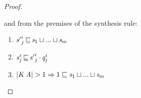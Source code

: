 \begin{proof}
\begin{enumerate}
        and from the premises of the synthesis rule:
        \begin{enumerate}[resume]
                \item $\GRANULEnt{s'} ^  i  _  j     \, \textcolor{coeffectColor}{\sqsubseteq} \,      \GRANULEnt{s} _  1     \sqcup ... \sqcup    \GRANULEnt{s} _  m$
                \item $ \GRANULEnt{s} ^  i  _  j     \, \textcolor{coeffectColor}{\sqsubseteq} \,    \GRANULEnt{s'} ^  i  _  j     \textcolor{coeffectColor}{\,\cdot\,}    \GRANULEnt{q} ^  i  _  j$
                \item $ |    K  \, \mathit{A}   | > 1 \Rightarrow 1 \sqsubseteq      \mathit{s} _  1     \sqcup ... \sqcup    \mathit{s} _  m $
        \end{enumerate}


\end{enumerate}
\end{proof}
